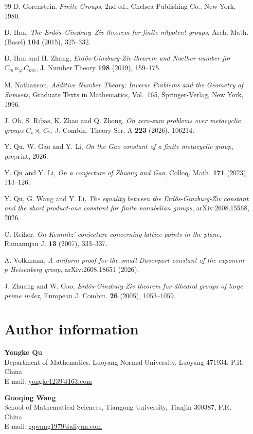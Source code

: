 \documentclass[a4paper, 12pt]{article}
\theoremstyle{definition}
\begin{document}
\begin{thebibliography}{99}
D. Gorenstein,
\emph{Finite Groups},
2nd ed., Chelsea Publishing Co., New York, 1980.

D. Han,
\emph{The Erd\H{o}s--Ginzburg--Ziv theorem for finite nilpotent groups},
Arch. Math. (Basel) \textbf{104} (2015), 325--332.

D. Han and H. Zhang,
\emph{Erd\H{o}s-Ginzburg-Ziv theorem and Noether number for
$C_m\ltimes_{\varphi} C_{mn}$},
J. Number Theory \textbf{198} (2019), 159--175.

M. Nathanson,
\emph{Additive Number Theory: Inverse Problems and the Geometry of Sumsets},
Graduate Texts in Mathematics, Vol.~165,
Springer-Verlag, New York, 1996.


J. Oh, S. Ribas, K. Zhao and Q. Zhong,
\emph{On zero-sum problems over metacyclic groups
$C_n\rtimes_s C_2$},
J. Combin. Theory Ser. A \textbf{223} (2026), 106214.

Y. Qu, W. Gao and Y. Li,
\emph{On the Gao constant of a finite metacyclic group},
preprint, 2026.

Y. Qu and Y. Li,
\emph{On a conjecture of Zhuang and Gao},
Colloq. Math. \textbf{171} (2023), 113--126.

Y. Qu, G. Wang and Y. Li,
\emph{The equality between the Erd\H{o}s-Ginzburg-Ziv constant
and the short product-one constant for finite nonabelian groups},
arXiv:2608.15568, 2026.

C. Reiher,
\emph{On Kemnitz' conjecture concerning lattice-points in the plane},
Ramanujan J. \textbf{13} (2007), 333--337.


A. Volkmann,
\emph{A uniform proof for the small Davenport constant of the exponent-$p$
Heisenberg group},
arXiv:2608.18651 (2026).


J. Zhuang and W. Gao,
\emph{Erd\H{o}s-Ginzburg-Ziv theorem for dihedral groups of large prime
index},
European J. Combin. \textbf{26} (2005), 1053--1059.

\end{thebibliography}

\section*{Author information}

\noindent\textbf{Yongke Qu}\\
Department of Mathematics, Luoyang Normal University,
Luoyang 471934, P.R. China\\
E-mail: \href{mailto:yongke1239@163.com}{yongke1239@163.com}

\medskip

\noindent\textbf{Guoqing Wang}\\
School of Mathematical Sciences, Tiangong University,
Tianjin 300387, P.R. China\\
E-mail: \href{mailto:gqwang1979@aliyun.com}{gqwang1979@aliyun.com}
\end{document}
